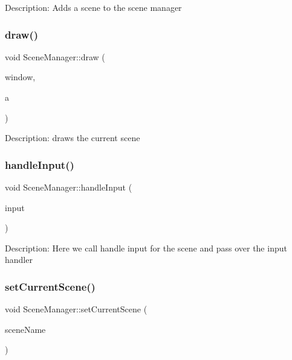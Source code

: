 Description\+: Adds a scene to the scene manager \mbox{\label{class_scene_manager_aeae169a2ae06250127fe6ff28cdbeebe}} 
\subsubsection{\texorpdfstring{draw()}{draw()}}
{\footnotesize\ttfamily void Scene\+Manager\+::draw (\begin{DoxyParamCaption}\item[{sf\+::\+Render\+Window \&}]{window,  }\item[{float}]{a }\end{DoxyParamCaption})}

Description\+: draws the current scene \mbox{\label{class_scene_manager_a404e7ccdd4fe5f8eef2348d7557a4805}} 
\subsubsection{\texorpdfstring{handleInput()}{handleInput()}}
{\footnotesize\ttfamily void Scene\+Manager\+::handle\+Input (\begin{DoxyParamCaption}\item[{\mbox{\hyperlink{class_input_handler}{Input\+Handler}} \&}]{input }\end{DoxyParamCaption})}

Description\+: Here we call handle input for the scene and pass over the input handler \mbox{\label{class_scene_manager_ab56b68e45ceb0feec829c0a070da1ab7}} 
\subsubsection{\texorpdfstring{setCurrentScene()}{setCurrentScene()}}
{\footnotesize\ttfamily void Scene\+Manager\+::set\+Current\+Scene (\begin{DoxyParamCaption}\item[{std\+::string}]{scene\+Name }\end{DoxyParamCaption})}

